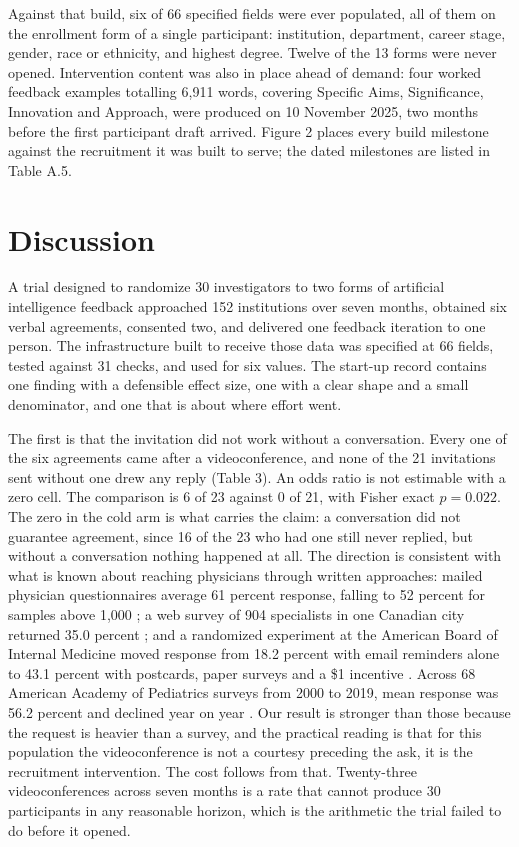 \documentclass[11pt,a4paper]{article}
\begin{document}
Against that build, six of 66 specified fields were ever populated, all of them on the enrollment form of a single participant: institution, department, career stage, gender, race or ethnicity, and highest degree. Twelve of the 13 forms were never opened. Intervention content was also in place ahead of demand: four worked feedback examples totalling 6,911 words, covering Specific Aims, Significance, Innovation and Approach, were produced on 10 November 2025, two months before the first participant draft arrived. Figure 2 places every build milestone against the recruitment it was built to serve; the dated milestones are listed in Table A.5.

\section{Discussion}

A trial designed to randomize 30 investigators to two forms of artificial intelligence feedback approached 152 institutions over seven months, obtained six verbal agreements, consented two, and delivered one feedback iteration to one person. The infrastructure built to receive those data was specified at 66 fields, tested against 31 checks, and used for six values. The start-up record contains one finding with a defensible effect size, one with a clear shape and a small denominator, and one that is about where effort went.

The first is that the invitation did not work without a conversation. Every one of the six agreements came after a videoconference, and none of the 21 invitations sent without one drew any reply (Table 3). An odds ratio is not estimable with a zero cell. The comparison is 6 of 23 against 0 of 21, with Fisher exact $p = 0.022$. The zero in the cold arm is what carries the claim: a conversation did not guarantee agreement, since 16 of the 23 who had one still never replied, but without a conversation nothing happened at all. The direction is consistent with what is known about reaching physicians through written approaches: mailed physician questionnaires average 61 percent response, falling to 52 percent for samples above 1,000 \cite{r28}; a web survey of 904 specialists in one Canadian city returned 35.0 percent \cite{r29}; and a randomized experiment at the American Board of Internal Medicine moved response from 18.2 percent with email reminders alone to 43.1 percent with postcards, paper surveys and a \$1 incentive \cite{r30}. Across 68 American Academy of Pediatrics surveys from 2000 to 2019, mean response was 56.2 percent and declined year on year \cite{r31}. Our result is stronger than those because the request is heavier than a survey, and the practical reading is that for this population the videoconference is not a courtesy preceding the ask, it is the recruitment intervention. The cost follows from that. Twenty-three videoconferences across seven months is a rate that cannot produce 30 participants in any reasonable horizon, which is the arithmetic the trial failed to do before it opened.
\end{document}
